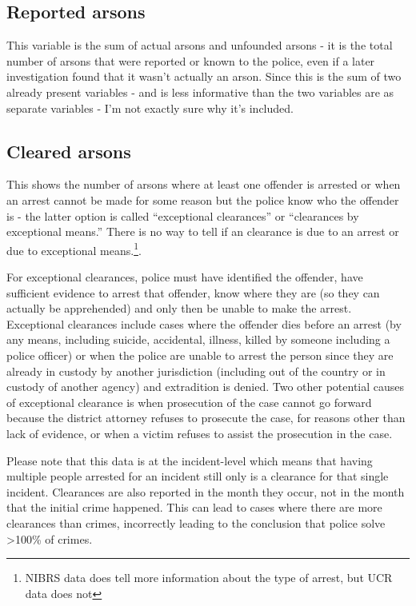 \documentclass[
  12pt,
  openany]{book}
\begin{document}
\hypertarget{reported-arsons}{%
\subsection{Reported arsons}\label{reported-arsons}}

This variable is the sum of actual arsons and unfounded arsons - it is the total number of arsons that were reported or known to the police, even if a later investigation found that it wasn't actually an arson. Since this is the sum of two already present variables - and is less informative than the two variables are as separate variables - I'm not exactly sure why it's included.

\hypertarget{cleared-arsons}{%
\subsection{Cleared arsons}\label{cleared-arsons}}

This shows the number of arsons where at least one offender is arrested or when an arrest cannot be made for some reason but the police know who the offender is - the latter option is called ``exceptional clearances'' or ``clearances by exceptional means.'' There is no way to tell if an clearance is due to an arrest or due to exceptional means.\footnote{NIBRS data does tell more information about the type of arrest, but UCR data does not}.

For exceptional clearances, police must have identified the offender, have sufficient evidence to arrest that offender, know where they are (so they can actually be apprehended) and only then be unable to make the arrest. Exceptional clearances include cases where the offender dies before an arrest (by any means, including suicide, accidental, illness, killed by someone including a police officer) or when the police are unable to arrest the person since they are already in custody by another jurisdiction (including out of the country or in custody of another agency) and extradition is denied. Two other potential causes of exceptional clearance is when prosecution of the case cannot go forward because the district attorney refuses to prosecute the case, for reasons other than lack of evidence, or when a victim refuses to assist the prosecution in the case.

Please note that this data is at the incident-level which means that having multiple people arrested for an incident still only is a clearance for that single incident. Clearances are also reported in the month they occur, not in the month that the initial crime happened. This can lead to cases where there are more clearances than crimes, incorrectly leading to the conclusion that police solve \textgreater100\% of crimes.
\end{document}

